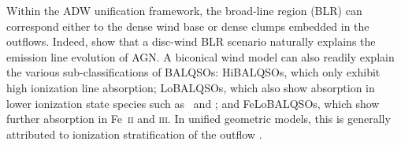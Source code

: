 \documentclass[useAMS,usenatbib]{mn2e_x}
\begin{document}
Within the ADW  unification framework, the broad-line region (BLR) can 
correspond either to the dense wind base or dense clumps embedded
in the outflows. Indeed, \cite{elitzur2014} show that a disc-wind BLR scenario
naturally explains the emission line evolution of AGN.
A biconical wind model can also readily explain the various sub-classifications of BALQSOs: 
HiBALQSOs, which only exhibit high ionization line absorption; LoBALQSOs, which also show
absorption in lower ionization state species such as \mg\ and \al; and
FeLoBALQSOs, which show further absorption in Fe~\textsc{ii} and \textsc{iii}.
In unified geometric models, this is generally attributed to ionization stratification
of the outflow \citep[e.g.][]{elvis2000}.

\end{document}
